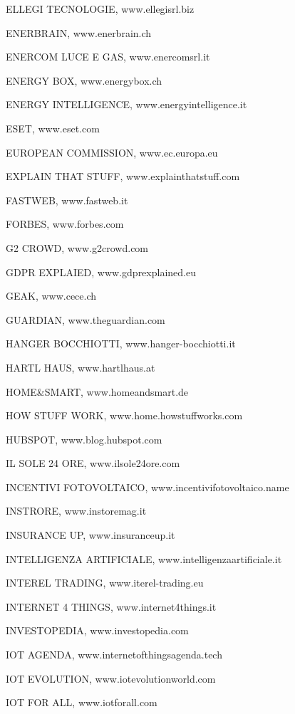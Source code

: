 \noindent ELLEGI TECNOLOGIE, www.ellegisrl.biz

\noindent ENERBRAIN, www.enerbrain.ch

\noindent ENERCOM LUCE E GAS, www.enercomsrl.it 

\noindent ENERGY BOX, www.energybox.ch

\noindent ENERGY INTELLIGENCE, www.energyintelligence.it

\noindent ESET, www.eset.com 

\noindent EUROPEAN COMMISSION, www.ec.europa.eu 

\noindent EXPLAIN THAT STUFF, www.explainthatstuff.com 

\noindent FASTWEB, www.fastweb.it 

\noindent FORBES, www.forbes.com 

\noindent G2 CROWD, www.g2crowd.com 

\noindent GDPR EXPLAIED, www.gdprexplained.eu 

\noindent GEAK, www.cece.ch

\noindent GUARDIAN, www.theguardian.com 

\noindent HANGER BOCCHIOTTI, www.hanger-bocchiotti.it

\noindent HARTL HAUS, www.hartlhaus.at

\noindent HOME\&SMART, www.homeandsmart.de

\noindent HOW STUFF WORK, www.home.howstuffworks.com

\noindent HUBSPOT, www.blog.hubspot.com

\noindent IL SOLE 24 ORE, www.ilsole24ore.com 

\noindent INCENTIVI FOTOVOLTAICO, www.incentivifotovoltaico.name

\noindent INSTRORE, www.instoremag.it

\noindent INSURANCE UP, www.insuranceup.it 

\noindent INTELLIGENZA ARTIFICIALE, www.intelligenzaartificiale.it

\noindent INTEREL TRADING, www.iterel-trading.eu 

\noindent INTERNET 4 THINGS, www.internet4things.it 

\noindent INVESTOPEDIA, www.investopedia.com 

\noindent IOT AGENDA, www.internetofthingsagenda.tech 

\noindent IOT EVOLUTION, www.iotevolutionworld.com 

\noindent IOT FOR ALL, www.iotforall.com 

